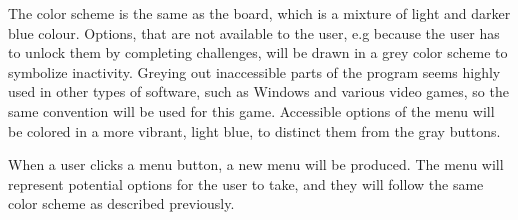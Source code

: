 The color scheme is the same as the board, which is a mixture of light and darker blue colour. 
Options, that are not available to the user, e.g because the user has to unlock them by completing challenges, will be drawn in a grey color scheme to symbolize inactivity.
Greying out inaccessible parts of the program seems highly used in other types of software, such as Windows and various video games, so the same convention will be used for this game.
Accessible options of the menu will be colored in a more vibrant, light blue, to distinct them from the gray buttons.\newline


When a user clicks a menu button, a new menu will be produced.
The menu will represent potential options for the user to take, and they will follow the same color scheme as described previously.